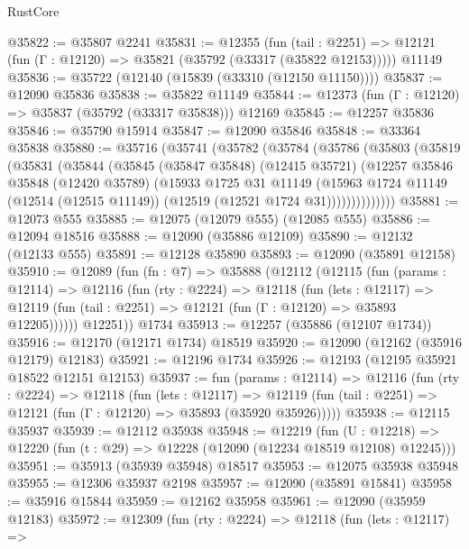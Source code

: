\begin{lexlean}{RustCore}
\begin{coremodule}
@35822 := @35807 @2241
@35831 := @12355
    (fun (tail : @2251) => @12121 (fun (Γ : @12120) => @35821 (@35792 (@33317 (@35822 @12153)))))
    @11149
@35836 := @35722 (@12140 (@15839 (@33310 (@12150 @11150))))
@35837 := @12090 @35836
@35838 := @35822 @11149
@35844 := @12373 (fun (Γ : @12120) => @35837 (@35792 (@33317 @35838))) @12169
@35845 := @12257 @35836
@35846 := @35790 @15914
@35847 := @12090 @35846
@35848 := @33364 @35838
@35880 := @35716
    (@35741
      (@35782
        (@35784
          (@35786
            (@35803
              (@35819
                (@35831
                  (@35844
                    (@35845
                      (@35847 @35848)
                      (@12415 @35721)
                      (@12257
                        @35846
                        @35848
                        (@12420 @35789)
                        (@15933
                          @1725
                          @31
                          @11149
                          (@15963
                            @1724
                            @11149
                            (@12514 (@12515 @11149))
                            (@12519 (@12521 @1724 @31))))))))))))))
@35881 := @12073 @555
@35885 := @12075 (@12079 @555) (@12085 @555)
@35886 := @12094 @18516
@35888 := @12090 (@35886 @12109)
@35890 := @12132 (@12133 @555)
@35891 := @12128 @35890
@35893 := @12090 (@35891 @12158)
@35910 := @12089
    (fun (fn : @7) =>
    @35888
      (@12112
        (@12115
          (fun (params : @12114) =>
          @12116
            (fun (rty : @2224) =>
            @12118
              (fun (lets : @12117) =>
              @12119 (fun (tail : @2251) => @12121 (fun (Γ : @12120) => @35893 @12205))))))
        @12251))
    @1734
@35913 := @12257 (@35886 (@12107 @1734))
@35916 := @12170 (@12171 @1734) @18519
@35920 := @12090 (@12162 (@35916 @12179) @12183)
@35921 := @12196 @1734
@35926 := @12193 (@12195 @35921 @18522 @12151 @12153)
@35937 := fun (params : @12114) =>
  @12116
    (fun (rty : @2224) =>
    @12118
      (fun (lets : @12117) =>
      @12119 (fun (tail : @2251) => @12121 (fun (Γ : @12120) => @35893 (@35920 @35926)))))
@35938 := @12115 @35937
@35939 := @12112 @35938
@35948 := @12219
    (fun (U : @12218) => @12220 (fun (t : @29) => @12228 (@12090 (@12234 @18519 @12108) @12245)))
@35951 := @35913 (@35939 @35948) @18517
@35953 := @12075 @35938 @35948
@35955 := @12306 @35937 @2198
@35957 := @12090 (@35891 @15841)
@35958 := @35916 @15844
@35959 := @12162 @35958
@35961 := @12090 (@35959 @12183)
@35972 := @12309
    (fun (rty : @2224) =>
    @12118
      (fun (lets : @12117) =>

\end{coremodule}
\end{lexlean}
